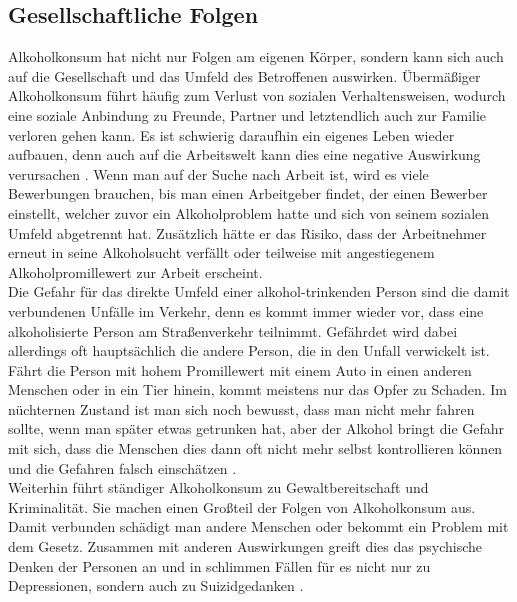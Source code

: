 \documentclass[12pt]{article}
\begin{document}
\subsection{Gesellschaftliche Folgen}                                                                                                                
Alkoholkonsum hat nicht nur Folgen am eigenen Körper, sondern kann sich auch auf die Gesellschaft und das Umfeld des Betroffenen auswirken. Übermäßiger Alkoholkonsum führt häufig zum Verlust von sozialen Verhaltensweisen, wodurch eine soziale Anbindung zu Freunde, Partner und letztendlich auch zur Familie verloren gehen kann. Es ist schwierig daraufhin ein eigenes Leben wieder aufbauen, denn auch auf die Arbeitswelt kann dies eine negative Auswirkung verursachen \autocite[4]{burger_bundes-gesundheitssurvey_2003}. Wenn man auf der Suche nach Arbeit ist, wird es viele Bewerbungen brauchen, bis man einen Arbeitgeber findet, der einen Bewerber einstellt, welcher zuvor ein Alkoholproblem hatte und sich von seinem sozialen Umfeld abgetrennt hat. Zusätzlich hätte er das Risiko, dass der Arbeitnehmer erneut in seine Alkoholsucht verfällt oder teilweise mit angestiegenem Alkoholpromillewert zur Arbeit erscheint. \\
Die Gefahr für das direkte Umfeld einer alkohol-trinkenden Person sind die damit verbundenen Unfälle im Verkehr, denn es kommt immer wieder vor, dass eine alkoholisierte Person am Straßenverkehr teilnimmt. Gefährdet wird dabei allerdings oft hauptsächlich die andere Person, die in den Unfall verwickelt ist. Fährt die Person mit hohem Promillewert mit einem Auto in einen anderen Menschen oder in ein Tier hinein, kommt meistens nur das Opfer zu Schaden. Im nüchternen Zustand ist man sich noch bewusst, dass man nicht mehr fahren sollte, wenn man später etwas getrunken hat, aber der Alkohol bringt die Gefahr mit sich, dass die Menschen dies dann oft nicht mehr selbst kontrollieren können und die Gefahren falsch einschätzen \autocite[4]{burger_bundes-gesundheitssurvey_2003}. \\
Weiterhin führt ständiger Alkoholkonsum zu Gewaltbereitschaft und Kriminalität. Sie machen einen Großteil der Folgen von Alkoholkonsum aus. Damit verbunden schädigt man andere Menschen oder bekommt ein Problem mit dem Gesetz. Zusammen mit anderen Auswirkungen greift dies das psychische Denken der Personen an und in schlimmen Fällen für es nicht nur zu Depressionen, sondern auch zu Suizidgedanken \autocite[4]{burger_bundes-gesundheitssurvey_2003}. \\
\end{document}
